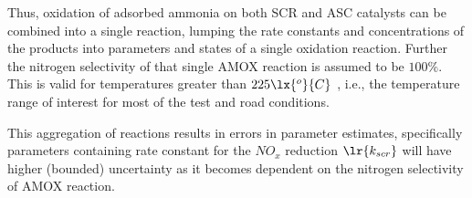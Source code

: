 Thus, oxidation of adsorbed ammonia on both SCR and ASC catalysts can be combined into a single reaction, lumping
the rate constants and concentrations of the products into parameters and states of a single oxidation reaction. Further
the nitrogen selectivity of that single AMOX reaction is assumed to be $100\%$. This is valid for temperatures greater
than $225 \lx{^o}{C}$ \cite{jain2023diagnostics}, i.e., the temperature range of interest for most of the test and road
conditions.

This aggregation of reactions results in errors in parameter estimates, specifically parameters containing rate constant for the $NO_x$ reduction $\lr{k_{scr}}$ will have higher (bounded) uncertainty as it becomes dependent on the nitrogen selectivity of AMOX reaction.
